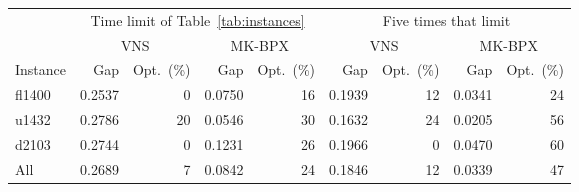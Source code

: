 \begin{tabular}{lrrrrrrrr}
\toprule
 & \multicolumn{4}{c}{Time limit of Table~\ref{tab:instances}} & \multicolumn{4}{c}{Five times that limit} \\
\cmidrule(lr){2-5}\cmidrule(lr){6-9}
 & \multicolumn{2}{c}{VNS} & \multicolumn{2}{c}{MK-BPX} & \multicolumn{2}{c}{VNS} & \multicolumn{2}{c}{MK-BPX} \\
Instance & Gap & Opt.\ (\%) & Gap & Opt.\ (\%) & Gap & Opt.\ (\%) & Gap & Opt.\ (\%) \\
\midrule
fl1400 & 0.2537 & 0 & 0.0750 & 16 & 0.1939 & 12 & 0.0341 & 24 \\
u1432 & 0.2786 & 20 & 0.0546 & 30 & 0.1632 & 24 & 0.0205 & 56 \\
d2103 & 0.2744 & 0 & 0.1231 & 26 & 0.1966 & 0 & 0.0470 & 60 \\
\midrule
All & 0.2689 & 7 & 0.0842 & 24 & 0.1846 & 12 & 0.0339 & 47 \\
\bottomrule
\end{tabular}